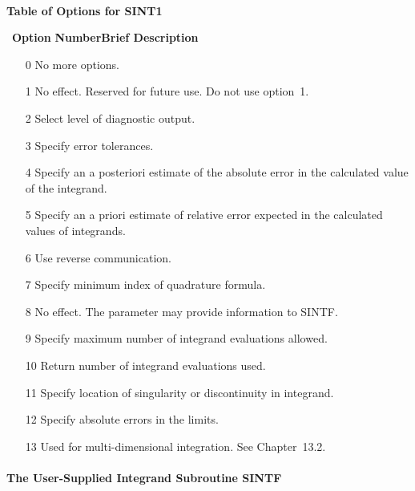 \documentclass[twoside]{MATH77}
\begin{document}
\newpage\ \centerline{{\bf Table of Options for SINT1}\hspace{.5in}}
\ {\bf Option}\newline
{\bf Number\hspace{.4in}Brief Description}\vspace{-3pt}
\begin{itemize}
\item[0]  No more options.

\item[1]  No effect. Reserved for future use. Do not use option~1.

\item[2]  Select level of diagnostic output.

\item[3]  Specify error tolerances.

\item[4]  Specify an a posteriori estimate of the absolute error in the
calculated value of the integrand.

\item[5]  Specify an a priori estimate of relative error expected in the
calculated values of integrands.

\item[6]  Use reverse communication.

\item[7]  Specify minimum index of quadrature formula.

\item[8]  No effect. The parameter may provide information to SINTF.

\item[9]  Specify maximum number of integrand evaluations allowed.

\item[10]  Return number of integrand evaluations used.

\item[11]  Specify location of singularity or discontinuity in integrand.

\item[12]  Specify absolute errors in the limits.

\item[13]  Used for multi-dimensional integration. See Chapter~13.2.
\end{itemize}

\paragraph{The User-Supplied Integrand Subroutine SINTF\label{SINTF}}
\end{document}
